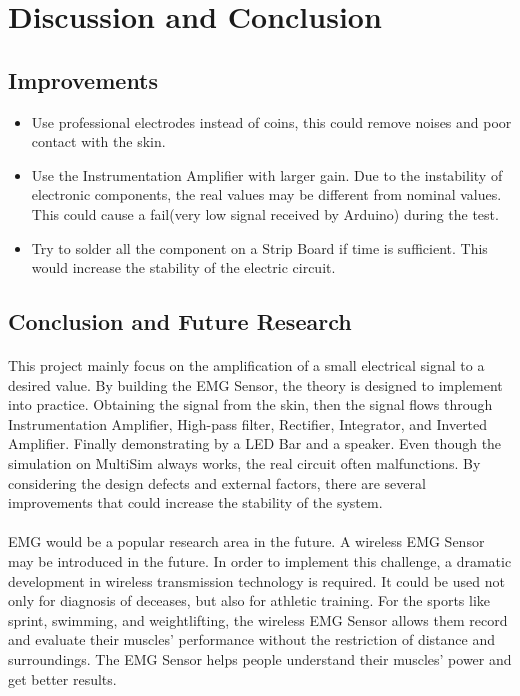 \documentclass[12pt]{article}
\begin{document}
    
    \section{Discussion and Conclusion}
    \subsection{Improvements}
    \begin{itemize}
   \item Use professional electrodes instead of coins, this could remove noises and poor contact with the skin.   
   \item Use the Instrumentation Amplifier with larger gain. Due to the instability of electronic components, the real values may be different from nominal values. This could cause a fail(very low signal received by Arduino) during the test.
   \item Try to solder all the component on a Strip Board if time is sufficient. This would increase the stability of the electric circuit.
   \end{itemize}
    
    
    
    \subsection{Conclusion and Future Research}
    \paragraph{}
    This project mainly focus on the amplification of a small electrical signal to a desired value. By building the EMG Sensor, the theory is designed to implement into practice. Obtaining the signal from the skin, then the signal flows through Instrumentation Amplifier, High-pass filter, Rectifier, Integrator, and Inverted Amplifier. Finally demonstrating by a LED Bar and a speaker. Even though the simulation on MultiSim always works, the real circuit often malfunctions. By considering the design defects and external factors, there are several improvements that could increase the stability of the system.
    \paragraph{}
    EMG would be a popular research area in the future. A wireless EMG Sensor may be introduced in the future. In order to implement this challenge, a dramatic development in wireless transmission technology is required. It could be used not only for diagnosis of deceases, but also for athletic training. For the sports like sprint, swimming, and weightlifting, the wireless EMG Sensor allows them record and evaluate their muscles' performance without the restriction of distance and surroundings. The EMG Sensor helps people understand their muscles' power and get better results.   
    
\end{document}
